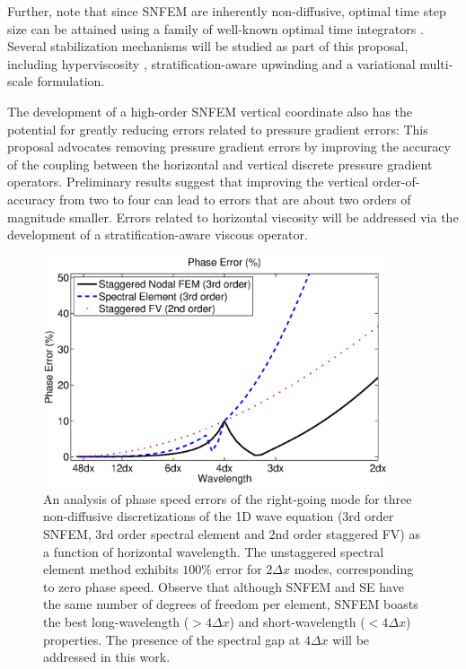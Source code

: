 \documentclass[11pt]{article}
\begin{document}
Further, note that since SNFEM are inherently non-diffusive, optimal time step size can be attained using a family of well-known optimal time integrators \cite{kinnmark1984one}.  Several stabilization mechanisms will be studied as part of this proposal, including hyperviscosity \cite{guba2014viscosity, ullrich2014global}, stratification-aware upwinding and a variational multi-scale formulation.

The development of a high-order SNFEM vertical coordinate also has the potential for greatly reducing errors related to pressure gradient errors:  This proposal advocates removing pressure gradient errors by improving the accuracy of the coupling between the horizontal and vertical discrete pressure gradient operators.  Preliminary results suggest that improving the vertical order-of-accuracy from two to four can lead to errors that are about two orders of magnitude smaller.  Errors related to horizontal viscosity will be addressed via the development of a stratification-aware viscous operator.

\begin{figure}
\begin{center}
\includegraphics[width=4in, clip=true, trim=0cm 0.1cm 0cm 0.1cm]{PhaseErrors}
\end{center}
\caption{An analysis of phase speed errors of the right-going mode for three non-diffusive discretizations of the 1D wave equation (3rd order SNFEM, 3rd order spectral element and 2nd order staggered FV) as a function of horizontal wavelength.  The unstaggered spectral element method exhibits $100\%$ error for $2 \Delta x$ modes, corresponding to zero phase speed.  Observe that although SNFEM and SE have the same number of degrees of freedom per element, SNFEM boasts the best long-wavelength ($> 4 \Delta x$) and short-wavelength ($< 4 \Delta x$) properties.  The presence of the spectral gap at $4 \Delta x$ will be addressed in this work.} \label{fig:SNFEMEigenstructure}
\end{figure}
\end{document}
